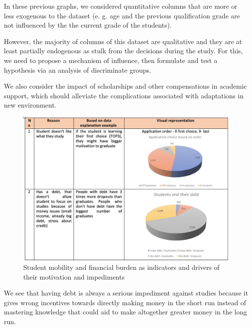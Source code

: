 \documentclass[
  letterpaper,
  DIV=11,
  numbers=noendperiod]{scrartcl}
\begin{document}
In these previous graphs, we considered quantitative columns that are
more or less exogenous to the dataset (e. g. age and the previous
qualification grade are not influenced by the the current grade of the
students).

However, the majority of columns of this dataset are qualitative and
they are at least partially endogenous as stulk from the decisions
during the study. For this, we need to propose a mechanism of influence,
then formulate and test a hypothesis via an analysis of discriminate
groups.

We also consider the impact of scholarships and other compensations in
academic support, which should alleviate the complications associated
with adaptations in new environment.

\begin{figure}

{\centering \includegraphics{./figs/reasons-1.jpg}

}

\caption{Student mobility and financial burden as indicators and drivers
of their motivation and impediments}

\end{figure}

We see that having debt is always a serious impediment against studies
because it gives wrong incentives towards directly making money in the
short run instead of mastering knowledge that could aid to make
altogether greater money in the long run.
\end{document}
